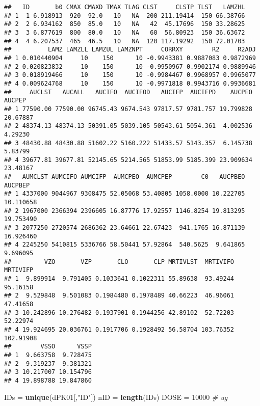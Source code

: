 \documentclass[
  9pt,
]{krantz}
\newenvironment{Shaded}{\begin{snugshade}}{\end{snugshade}}
\newcommand{\CommentTok}[1]{\textcolor[rgb]{0.56,0.35,0.01}{\textit{#1}}}
\newcommand{\DecValTok}[1]{\textcolor[rgb]{0.00,0.00,0.81}{#1}}
\newcommand{\KeywordTok}[1]{\textcolor[rgb]{0.13,0.29,0.53}{\textbf{#1}}}
\newcommand{\NormalTok}[1]{#1}
\newcommand{\StringTok}[1]{\textcolor[rgb]{0.31,0.60,0.02}{#1}}
\begin{document}
\begin{verbatim}
##   ID       b0 CMAX CMAXD TMAX TLAG CLST     CLSTP TLST   LAMZHL
## 1  1 6.918913  920  92.0   10   NA  200 211.19414  150 66.38766
## 2  2 6.934162  850  85.0   10   NA   42  45.17696  150 33.28625
## 3  3 6.877619  800  80.0   10   NA   60  56.80923  150 36.63672
## 4  4 6.207537  465  46.5   10   NA  120 117.19292  150 72.01703
##          LAMZ LAMZLL LAMZUL LAMZNPT     CORRXY        R2     R2ADJ
## 1 0.010440904     10    150      10 -0.9943381 0.9887083 0.9872969
## 2 0.020823832     10    150      10 -0.9950967 0.9902174 0.9889946
## 3 0.018919466     10    150      10 -0.9984467 0.9968957 0.9965077
## 4 0.009624768     10    150      10 -0.9971818 0.9943716 0.9936681
##     AUCLST   AUCALL   AUCIFO  AUCIFOD   AUCIFP  AUCIFPD    AUCPEO   AUCPEP
## 1 77590.00 77590.00 96745.43 9674.543 97817.57 9781.757 19.799828 20.67887
## 2 48374.13 48374.13 50391.05 5039.105 50543.61 5054.361  4.002536  4.29230
## 3 48430.88 48430.88 51602.22 5160.222 51433.57 5143.357  6.145738  5.83799
## 4 39677.81 39677.81 52145.65 5214.565 51853.99 5185.399 23.909634 23.48167
##   AUMCLST AUMCIFO AUMCIFP  AUMCPEO  AUMCPEP        C0   AUCPBEO   AUCPBEP
## 1 4337000 9044967 9308475 52.05068 53.40805 1058.0000 10.222705 10.110658
## 2 1967000 2366394 2396605 16.87776 17.92557 1146.8254 19.813295 19.753490
## 3 2077250 2720574 2686362 23.64661 22.67423  941.1765 16.871139 16.926460
## 4 2245250 5410815 5336766 58.50441 57.92864  540.5625  9.641865  9.696095
##         VZO       VZP       CLO       CLP MRTIVLST  MRTIVIFO  MRTIVIFP
## 1  9.899914  9.791405 0.1033641 0.1022311 55.89638  93.49244  95.16158
## 2  9.529848  9.501083 0.1984480 0.1978489 40.66223  46.96061  47.41658
## 3 10.242896 10.276482 0.1937901 0.1944256 42.89102  52.72203  52.22974
## 4 19.924695 20.036761 0.1917706 0.1928492 56.58704 103.76352 102.91908
##        VSSO      VSSP
## 1  9.663758  9.728475
## 2  9.319237  9.381321
## 3 10.217007 10.154796
## 4 19.898788 19.847860
\end{verbatim}

\begin{Shaded}
\begin{Highlighting}[]
\NormalTok{IDs =}\StringTok{ }\KeywordTok{unique}\NormalTok{(dPK01[,}\StringTok{"ID"}\NormalTok{])}
\NormalTok{nID =}\StringTok{ }\KeywordTok{length}\NormalTok{(IDs)}
\NormalTok{DOSE =}\StringTok{ }\DecValTok{10000} \CommentTok{# ug}
\end{Highlighting}
\end{Shaded}
\end{document}
